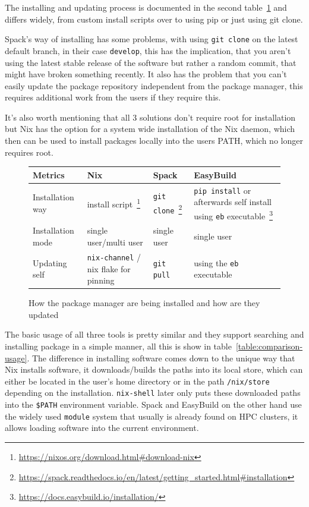 \documentclass{eceasst}
\begin{document}
The installing and updating process is documented in the second table~\ref{table:comparison-installation} and differs widely, from custom install scripts over to using pip or just using git clone.

Spack's way of installing has some problems, with using \texttt{git clone} on the latest default branch, in their case \texttt{develop}, this has the implication, that you aren't using the latest stable release of the software but rather a random commit, that might have broken something recently.
It also has the problem that you can't easily update the package repository independent from the package manager, this requires additional work from the users if they require this.

It's also worth mentioning that all 3 solutions don't require root for installation but Nix has the option for a system wide installation of the Nix daemon, which then can be used to install packages locally into the users PATH, which no longer requires root.

\begin{figure}
  \normalsize
  \caption{How the package manager are being installed and how are they updated}
  \label{table:comparison-installation}
  \centering
  \begin{tabular}{|p{2cm}|p{3.5cm}|p{3.5cm}|p{3.5cm}|}
    \hline
    \textbf{Metrics} & \textbf{Nix} & \textbf{Spack} & \textbf{EasyBuild} \\ \hline
    Installation way & install script~\footnote{\url{https://nixos.org/download.html\#download-nix}} & \texttt{git clone}~\footnote{\url{https://spack.readthedocs.io/en/latest/getting_started.html\#installation}} & \texttt{pip install} or afterwards self install using \texttt{eb} executable~\footnote{\url{https://docs.easybuild.io/installation/}} \\ \hline
    Installation mode & single user/multi user & single user & single user \\ \hline
    Updating self & \texttt{nix-channel} / nix flake for pinning & \texttt{git pull} & using the \texttt{eb} executable \\ \hline
  \end{tabular}
\end{figure}

The basic usage of all three tools is pretty similar and they support searching and installing package in a simple manner, all this is show in table~\ref{table:comparison-usage}.
The difference in installing software comes down to the unique way that Nix installs software, it downloads/builds the paths into its local store, which can either be located in the user's home directory or in the path \texttt{/nix/store} depending on the installation.
\texttt{nix-shell} later only puts these downloaded paths into the \texttt{\$PATH} environment variable.
Spack and EasyBuild on the other hand use the widely used \texttt{module} system that usually is already found on HPC clusters, it allows loading software into the current environment.
\end{document}

